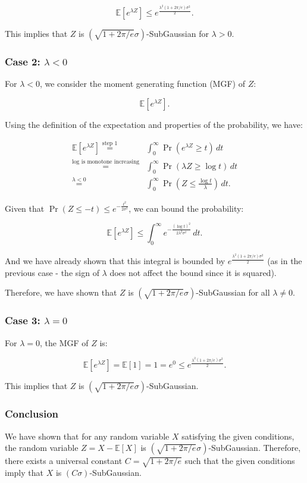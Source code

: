 \documentclass[a4 paper]{article}
\theoremstyle{boldStyle}
\theoremstyle{boldBlueStyle}
\theoremstyle{boldPurpleStyle}
\theoremstyle{boldRedStyle}
\begin{document}
\[
\mathbb{E}[e^{\lambda Z}] \leq  e^{\frac{\lambda^2 (1 + 2\pi/e) \sigma^2}{2}}.
\]

This implies that \(Z\) is \((\sqrt{1 + 2\pi/e} \sigma)\)-SubGaussian for \(\lambda > 0\).

\subsubsection*{Case 2: \(\lambda < 0\)}

For \(\lambda < 0\), we consider the moment generating function (MGF) of \(Z\):

\[
\mathbb{E}[e^{\lambda Z}].
\]

Using the definition of the expectation and properties of the probability, we have:

\begin{align*}
\mathbb{E}[e^{\lambda Z}] \stackrel{\text{step 1}}{=} &\int_0^\infty \Pr(e^{\lambda Z} \geq t) \, dt \\
\stackrel{\text{log is monotone increasing}}{=} &\int_0^\infty \Pr(\lambda Z \geq \log t) \, dt \\
\stackrel{\lambda < 0}{=} &\int_0^\infty \Pr\left(Z \leq \frac{\log t}{\lambda}\right) \, dt.
\end{align*}

Given that \(\Pr(Z \leq -t) \leq e^{-\frac{t^2}{2\sigma^2}}\), we can bound the probability:

\[
\mathbb{E}[e^{\lambda Z}] \leq \int_0^\infty e^{-\frac{(\log t)^2}{2\lambda^2 \sigma^2}} \, dt.
\]

And we have already shown that this integral is bounded by \(e^{\frac{\lambda^2 (1 + 2\pi/e) \sigma^2}{2}}\) 
(as in the previous case - the sign of \(\lambda\) does not affect the bound since it is squared).

Therefore, we have shown that \(Z\) is \((\sqrt{1 + 2\pi/e} \sigma)\)-SubGaussian for all \(\lambda \neq 0\).


\subsubsection*{Case 3: \(\lambda = 0\)}

For \(\lambda = 0\), the MGF of \(Z\) is:

\[
\mathbb{E}[e^{\lambda Z}] = \mathbb{E}[1] = 1 = e^0 \leq e^{\frac{\lambda^2 (1 + 2\pi/e) \sigma^2}{2}}.
\]

This implies that \(Z\) is \((\sqrt{1 + 2\pi/e} \sigma)\)-SubGaussian.


\subsubsection*{Conclusion}

We have shown that for any random variable \(X\) satisfying the given conditions, the random variable \(Z = X - \mathbb{E}[X]\) is \((\sqrt{1 + 2\pi/e} \sigma)\)-SubGaussian. 
Therefore, there exists a universal constant \(C = \sqrt{1 + 2\pi/e}\) such that the given conditions imply that \(X\) is \((C\sigma)\)-SubGaussian.
\end{document}
